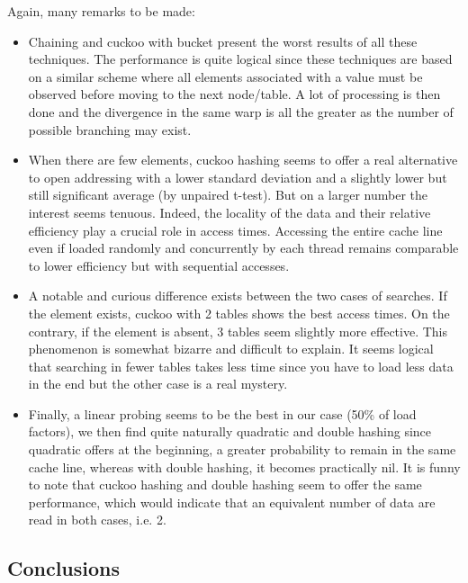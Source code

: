 Again, many remarks to be made:
\begin{itemize}
    \item Chaining and cuckoo with bucket present the worst results of all these techniques. The performance is quite logical since these techniques are based on a similar scheme where all elements associated with a value must be observed before moving to the next node/table. A lot of processing is then done and the divergence in the same warp is all the greater as the number of possible branching may exist.
    \item When there are few elements, cuckoo hashing seems to offer a real alternative to open addressing with a lower standard deviation and a slightly lower but still significant average (by unpaired t-test). But on a larger number the interest seems tenuous. Indeed, the locality of the data and their relative efficiency play a crucial role in access times. Accessing the entire cache line even if loaded randomly and concurrently by each thread remains comparable to lower efficiency but with sequential accesses.
    \item A notable and curious difference exists between the two cases of searches. If the element exists, cuckoo with 2 tables shows the best access times. On the contrary, if the element is absent, 3 tables seem slightly more effective. This phenomenon is somewhat bizarre and difficult to explain. It seems logical that searching in fewer tables takes less time since you have to load less data in the end but the other case is a real mystery.
    \item Finally, a linear probing seems to be the best in our case (50\% of load factors), we then find quite naturally quadratic and double hashing since quadratic offers at the beginning, a greater probability to remain in the same cache line, whereas with double hashing, it becomes practically nil. It is funny to note that cuckoo hashing and double hashing seem to offer the same performance, which would indicate that an equivalent number of data are read in both cases, i.e. 2.
\end{itemize}

\subsection{Conclusions}

